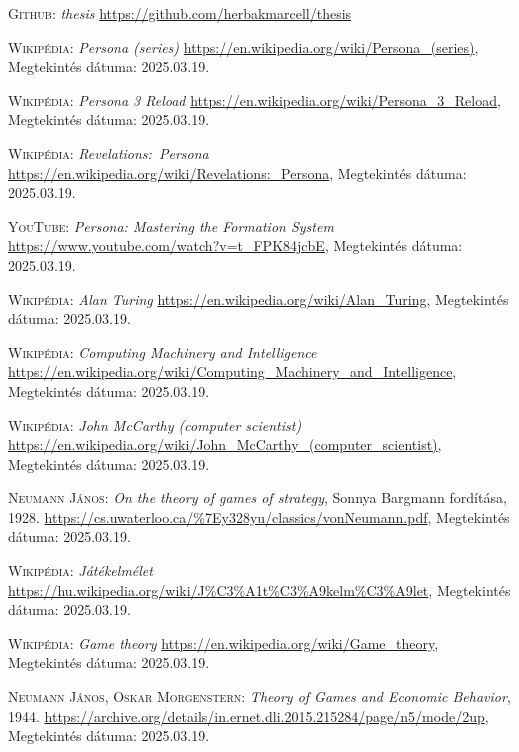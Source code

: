 \documentclass[
]{thesis-ekf}
\theoremstyle{definition}
\theoremstyle{remark}
\begin{document}
\begin{thebibliography}{2}

\textsc{Github:} \emph{thesis} 
\url{https://github.com/herbakmarcell/thesis}

\textsc{Wikipédia:} \emph{Persona (series)} 
\url{https://en.wikipedia.org/wiki/Persona_(series)}, Megtekintés dátuma: 2025.03.19.

\textsc{Wikipédia:} \emph{Persona 3 Reload} 
\url{https://en.wikipedia.org/wiki/Persona_3_Reload}, Megtekintés dátuma: 2025.03.19.

\textsc{Wikipédia:} \emph{Revelations:~Persona} 
\url{https://en.wikipedia.org/wiki/Revelations:_Persona}, Megtekintés dátuma: 2025.03.19.

\textsc{YouTube:} \emph{Persona: Mastering the Formation System} 
\url{https://www.youtube.com/watch?v=t_FPK84jcbE}, Megtekintés dátuma: 2025.03.19.

\textsc{Wikipédia:} \emph{Alan Turing} 
\url{https://en.wikipedia.org/wiki/Alan_Turing}, Megtekintés dátuma: 2025.03.19.

\textsc{Wikipédia:} \emph{Computing Machinery and Intelligence} 
\url{https://en.wikipedia.org/wiki/Computing_Machinery_and_Intelligence}, Megtekintés dátuma: 2025.03.19.

\textsc{Wikipédia:} \emph{John McCarthy (computer scientist)} 
\url{https://en.wikipedia.org/wiki/John_McCarthy_(computer_scientist)}, Megtekintés dátuma: 2025.03.19.

\textsc{Neumann János}: \emph{On the theory of games of strategy}, Sonnya Bargmann fordítása, 1928.
\url{https://cs.uwaterloo.ca/%7Ey328yu/classics/vonNeumann.pdf}, Megtekintés dátuma: 2025.03.19.

\textsc{Wikipédia:} \emph{Játékelmélet} 
\url{https://hu.wikipedia.org/wiki/J%C3%A1t%C3%A9kelm%C3%A9let}, Megtekintés dátuma: 2025.03.19.

\textsc{Wikipédia:} \emph{Game theory} 
\url{https://en.wikipedia.org/wiki/Game_theory}, Megtekintés dátuma: 2025.03.19.

\textsc{Neumann János, Oskar Morgenstern}: \emph{Theory of Games and Economic Behavior}, 1944.
\url{https://archive.org/details/in.ernet.dli.2015.215284/page/n5/mode/2up}, Megtekintés dátuma: 2025.03.19.


\end{thebibliography}
\end{document}
